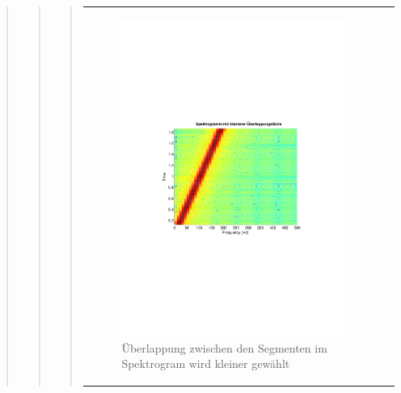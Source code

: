 \begin{quote}
\begin{quote}
\begin{quote}
\begin{center}
\begin{tabular}{ll}
\begin{minipage}{0.6\textwidth}
                        \begin{figure}[H]
                            \label{fig:}
                            \includegraphics[scale=0.63, trim = 3cm 9cm 3cm
                            9cm,
                            clip]{./Bilder/bsp_chirp_spectrogram_kleineUeberlappung}
                            \caption{Überlappung zwischen den Segmenten im
                            Spektrogram wird kleiner gewählt}
                        \end{figure}
    
                    \end{minipage}
                    \begin{minipage}{0.6\textwidth}
    

\end{minipage}
\end{tabular}
\end{center}
\end{quote}
\end{quote}
\end{quote}
